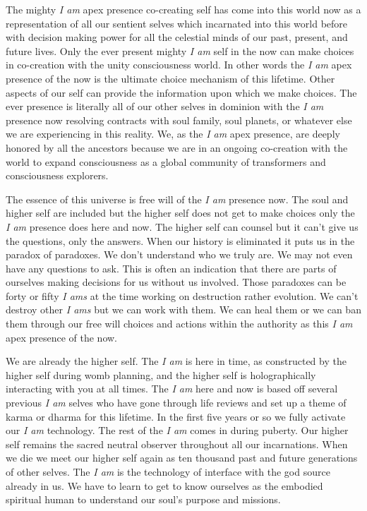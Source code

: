 The mighty \emph{I am} apex presence co-creating self has come into this
world now as a representation of all our sentient selves which
incarnated into this world before with decision making power for all the
celestial minds of our past, present, and future lives. Only the ever
present mighty \emph{I am} self in the now can make choices in
co-creation with the unity consciousness world. In other words the
\emph{I am} apex presence of the now is the ultimate choice mechanism of
this lifetime. Other aspects of our self can provide the information
upon which we make choices. The ever presence is literally all of our
other selves in dominion with the \emph{I am} presence now resolving
contracts with soul family, soul planets, or whatever else we are
experiencing in this reality. We, as the \emph{I am} apex presence, are
deeply honored by all the ancestors because we are in an ongoing
co-creation with the world to expand consciousness as a global community
of transformers and consciousness explorers.

The essence of this universe is free will of the \emph{I am} presence
now. The soul and higher self are included but the higher self does not
get to make choices only the \emph{I am} presence does here and now. The
higher self can counsel but it can't give us the questions, only the
answers. When our history is eliminated it puts us in the paradox of
paradoxes. We don't understand who we truly are. We may not even have
any questions to ask. This is often an indication that there are parts
of ourselves making decisions for us without us involved. Those
paradoxes can be forty or fifty \emph{I ams} at the time working on
destruction rather evolution. We can't destroy other \emph{I ams} but we
can work with them. We can heal them or we can ban them through our free
will choices and actions within the authority as this \emph{I am} apex
presence of the now.

We are already the higher self. The \emph{I am} is here in time, as
constructed by the higher self during womb planning, and the higher self
is holographically interacting with you at all times. The \emph{I am}
here and now is based off several previous \emph{I am} selves who have
gone through life reviews and set up a theme of karma or dharma for this
lifetime. In the first five years or so we fully activate our \emph{I
am} technology. The rest of the \emph{I am} comes in during puberty. Our
higher self remains the sacred neutral observer throughout all our
incarnations. When we die we meet our higher self again as ten thousand
past and future generations of other selves. The \emph{I am} is the
technology of interface with the god source already in us. We have to
learn to get to know ourselves as the embodied spiritual human to
understand our soul's purpose and missions.

